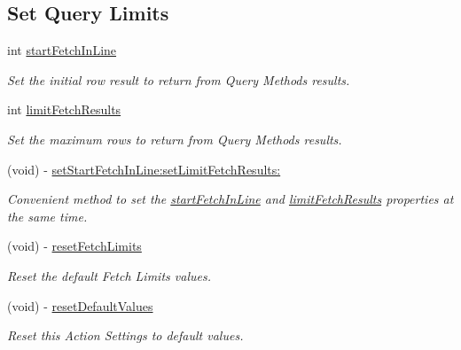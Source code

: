 \subsection*{Set Query Limits}
\begin{DoxyCompactItemize}
\item 
int \hyperlink{interface_j_p_d_b_manager_action_ad679e0229dbddd7d5c87a6348d33fc9e}{startFetchInLine}
\begin{DoxyCompactList}\small\item\em Set the initial row result to return from Query Methods results. \item\end{DoxyCompactList}\item 
int \hyperlink{interface_j_p_d_b_manager_action_a768d19efb483654b753bdc3a8bf1a197}{limitFetchResults}
\begin{DoxyCompactList}\small\item\em Set the maximum rows to return from Query Methods results. \item\end{DoxyCompactList}\item 
\hypertarget{interface_j_p_d_b_manager_action_aed8e76eb4ccf0c1794a3f0d4468d6c16}{
(void) -\/ \hyperlink{interface_j_p_d_b_manager_action_aed8e76eb4ccf0c1794a3f0d4468d6c16}{setStartFetchInLine:setLimitFetchResults:}}
\label{interface_j_p_d_b_manager_action_aed8e76eb4ccf0c1794a3f0d4468d6c16}

\begin{DoxyCompactList}\small\item\em Convenient method to set the \hyperlink{interface_j_p_d_b_manager_action_ad679e0229dbddd7d5c87a6348d33fc9e}{startFetchInLine} and \hyperlink{interface_j_p_d_b_manager_action_a768d19efb483654b753bdc3a8bf1a197}{limitFetchResults} properties at the same time. \item\end{DoxyCompactList}\item 
\hypertarget{interface_j_p_d_b_manager_action_aac879451f1f7769f2c22061f0b3d9479}{
(void) -\/ \hyperlink{interface_j_p_d_b_manager_action_aac879451f1f7769f2c22061f0b3d9479}{resetFetchLimits}}
\label{interface_j_p_d_b_manager_action_aac879451f1f7769f2c22061f0b3d9479}

\begin{DoxyCompactList}\small\item\em Reset the default Fetch Limits values. \item\end{DoxyCompactList}\item 
\hypertarget{interface_j_p_d_b_manager_action_a2217de1fa0fd2e0302200fa745e2fdf0}{
(void) -\/ \hyperlink{interface_j_p_d_b_manager_action_a2217de1fa0fd2e0302200fa745e2fdf0}{resetDefaultValues}}
\label{interface_j_p_d_b_manager_action_a2217de1fa0fd2e0302200fa745e2fdf0}

\begin{DoxyCompactList}\small\item\em Reset this Action Settings to default values. \item\end{DoxyCompactList}\end{DoxyCompactItemize}

